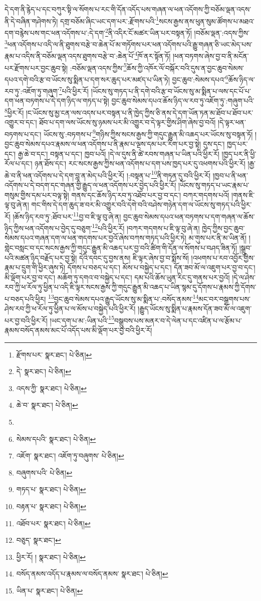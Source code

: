 དེ་དག་ནི་རྙེད་པ་དང་བཀུར་སྟི་ལ་སོགས་པ་རང་གི་དོན་འདོད་པས་གཞན་ལ་ཕན་འདོགས་ཀྱི་བཅོམ་ལྡན་འདས་ནི་དེ་བཞིན་གཤེགས་ཏེ། དགྲ་བཅོམ་ཞིང་ཡང་དག་པར་:རྫོགས་པའི་\footnote{རྫོགས་པར་  སྣར་ཐང་།  པེ་ཅིན། }སངས་རྒྱས་ནས་ཕུན་སུམ་ཚོགས་པ་མཐའ་དག་བརྙེས་པས་གང་ཕན་འདོགས་པ་:དེ་དག་\footnote{དེ་  སྣར་ཐང་།  པེ་ཅིན། }ནི་འདིར་ངོ་མཚར་ཡིན་པར་བསྟན་ཏོ། །བཅོམ་ལྡན་:འདས་ཀྱིས་\footnote{འདས་ཀྱི་  སྣར་ཐང་།  པེ་ཅིན། }ཕན་འདོགས་པ་འདི་ལ་ནི་ཐུགས་བརྩེ་བ་ཆེན་པོ་མ་གཏོགས་པར་ཕན་འདོགས་པའི་རྒྱུ་གཞན་ཅི་ཡང་མེད་པས་རྣམ་པ་འདིས་ནི་བཅོམ་ལྡན་འདས་ཐུགས་བརྩེ་བ་:ཆེན་པོ་\footnote{ཆེ་བ་  སྣར་ཐང་།  པེ་ཅིན། }ཁོ་ནར་སྟོན་ཏོ། །ཕན་བཏགས་ཞེས་བྱ་བ་ནི་མངོན་པར་རྫོགས་པར་བྱང་ཆུབ་སྟེ། :བཅོམ་ལྡན་འདས་ཀྱིས་\footnote{}ཆོས་ཀྱི་འཁོར་ལོ་བསྐོར་བའི་དུས་ན་བྱང་ཆུབ་སེམས་དཔའ་དགེ་བའི་རྩ་བ་ཡོངས་སུ་སྨིན་པ་དག་སར་ཆུད་པར་མཛད་པ་ཡིན་ཏེ། བྱང་ཆུབ་:སེམས་དཔའ་\footnote{སེམས་དཔའི་  སྣར་ཐང་།  པེ་ཅིན། }ཆོས་ཉིད་ལ་རབ་ཏུ་:འཇོག་ཏུ་གཞུག་\footnote{འཇོག་  སྣར་ཐང་། འཇོག་ཏུ་བཞུགས་  པེ་ཅིན། }པའི་ཕྱིར་རོ། །ཡོངས་སུ་གཏད་པ་ནི་དགེ་བའི་རྩ་བ་ཡོངས་སུ་མ་སྨིན་པ་ལས་དང་པོ་པ་དག་ཕན་བཏགས་པ་དེ་དག་ཉིད་ལ་གཏད་པ་སྟེ། བྱང་ཆུབ་སེམས་དཔའ་ཆོས་ཉིད་ལ་རབ་ཏུ་འཇོག་ཏུ་:གཞུག་པའི་\footnote{བཞུགས་པའི་  པེ་ཅིན། }ཕྱིར་རོ། །ང་ཡོངས་སུ་མྱ་ངན་ལས་འདས་པར་བསྟན་པ་ནི་ཁྱེད་ཀྱིས་ཅི་ནས་དེ་དག་ཡོན་ཏན་མ་ཐོབ་པ་ཐོབ་པར་འགྱུར་བ་དང་། ཐོབ་པ་དག་ལས་ཡོངས་སུ་ཉམས་པར་མི་འགྱུར་བ་དེ་ལྟར་གྱིས་ཤིག་ཞེས་བྱ་བའོ། །དེ་ལྟར་ཕན་བཏགས་པ་དང་། ཡོངས་སུ་:བཏགས་པ་\footnote{གཏད་པ་  སྣར་ཐང་།  པེ་ཅིན། }གཉིས་ཀྱིས་སངས་རྒྱས་ཀྱི་གདུང་རྒྱུན་མི་འཆད་པར་ཡོངས་སུ་བསྟན་ཏོ། །བྱང་ཆུབ་སེམས་དཔའ་རྣམས་ལ་ཕན་འདོགས་པ་ནི་རྣམ་པ་ལྔས་དམ་པར་རིག་པར་བྱ་སྟེ། དུས་དང་། ཁྱད་པར་དང་། རྒྱ་ཆེ་བ་དང་། བསྟན་པ་དང་། ཁྱབ་པའོ། །དེ་ལ་དུས་ནི་ཚེ་རབས་གཞན་པ་ཡིན་པའི་ཕྱིར་རོ། །ཁྱད་པར་ནི་ཕྱི་རོལ་པ་དང་། ཉན་ཐོས་དང་། རང་སངས་རྒྱས་ཀྱིས་ཕན་འདོགས་པ་དག་པས་ཁྱད་པར་དུ་འཕགས་པའི་ཕྱིར་རོ། །རྒྱ་ཆེ་བ་ནི་ཕན་འདོགས་པ་དེ་དག་བླ་ན་མེད་པའི་ཕྱིར་རོ། །:བསྟན་པ་\footnote{བརྟན་པ་  སྣར་ཐང་།  པེ་ཅིན། }ནི་གཏན་དུ་བའི་ཕྱིར་རོ། །ཁྱབ་པ་ནི་ཕན་འདོགས་པ་དེ་བདག་དང་གཞན་གྱི་རྒྱུད་ལ་ཕན་འདོགས་པར་བྱེད་པའི་ཕྱིར་རོ། །ཡོངས་སུ་གཏད་པ་ཡང་རྣམ་པ་གསུམ་གྱིས་དམ་པར་བལྟ་སྟེ། གནས་དང་ཆོས་ཉིད་རབ་ཏུ་འཐོབ་པར་བྱ་བ་དང་། བཀར་གདགས་པའོ། །གནས་ཇི་ལྟ་བུ་ཞེ་ན། གང་གིས་དེ་དག་ཆུད་ཟ་བར་མི་འགྱུར་བའི་དགེ་བའི་བཤེས་གཉེན་དག་ལ་ཡོངས་སུ་གཏད་པའི་ཕྱིར་རོ། །ཆོས་ཉིད་རབ་ཏུ་:ཐོབ་པར་\footnote{འཐོབ་པར་  སྣར་ཐང་།  པེ་ཅིན། }བྱ་བ་ཇི་ལྟ་བུ་ཞེ་ན། བྱང་ཆུབ་སེམས་དཔའ་ཕན་བཏགས་པ་དག་གཞན་ལ་ཆོས་ཉིད་ཀྱིས་ཕན་འདོགས་པ་བྱེད་དུ་བཅུག་\footnote{བཅུད་  སྣར་ཐང་། }པའི་ཕྱིར་རོ། །བཀར་གདགས་པ་ཇི་ལྟ་བུ་ཞེ་ན། ཁྱེད་ཀྱིས་བྱང་ཆུབ་སེམས་དཔའ་གཞན་དག་ལ་ཕན་གདགས་པར་བྱའོ་ཞེས་བཀས་གཏད་པའི་ཕྱིར་ཏེ། མ་གུས་པར་ནི་མ་ཡིན་ནོ། །གླེང་བསླང་བ་དང་སངས་རྒྱས་ཀྱི་གདུང་རྒྱུན་མི་འཆད་པར་བྱ་བའི་ཚིག་གི་དོན་ལ་སོགས་པ་བཤད་ཟིན་ཏོ། །སྒྲུབ་པའི་མཚན་ཉིད་བརྗོད་པར་བྱ་སྟེ། དེའི་དབང་དུ་བྱས་ནས། ཇི་ལྟར་ཞེས་བྱ་བ་སྨོས་སོ། །འཕགས་པ་རབ་འབྱོར་གྱིས་རྣམ་པ་དྲུག་གི་ཕྱིར་ཞུས་ཏེ། དོགས་པ་བཅད་པ་དང་། མོས་པ་བསྐྱེད་པ་དང་། དོན་ཟབ་མོ་ལ་འཇུག་པར་བྱ་བ་དང་། མི་ལྡོག་པར་བྱ་བ་དང་། མཆོག་ཏུ་དགའ་བ་བསྐྱེད་པ་དང་། དམ་པའི་ཆོས་ཡུན་རིང་དུ་གནས་པར་བྱའོ། །དེ་ལ་ཤེས་རབ་ཀྱི་ཕ་རོལ་ཏུ་ཕྱིན་པ་འདི་ཇི་ལྟར་སངས་རྒྱས་ཀྱི་གདུང་རྒྱུན་མི་འཆད་པ་ཡིན་སྙམ་དུ་དོགས་པ་རྣམས་ཀྱི་དོགས་པ་བཅད་པའི་ཕྱིར། \footnote{ཕྱིར་རོ། །   སྣར་ཐང་།  པེ་ཅིན། }བྱང་ཆུབ་སེམས་དཔའ་རྒྱུད་ཡོངས་སུ་མ་སྨིན་པ་:བསོད་ནམས་\footnote{བསོད་ནམས་འདོད་པ་རྣམས་ལ་བསོད་ནམས་  སྣར་ཐང་།  པེ་ཅིན། }མང་བར་བསྒྲགས་པས་ཤེས་རབ་ཀྱི་ཕ་རོལ་ཏུ་ཕྱིན་པ་ལ་མོས་པ་བསྐྱེད་པའི་ཕྱིར་རོ། །རྒྱུད་ཡོངས་སུ་སྨིན་པ་རྣམས་དོན་ཟབ་མོ་ལ་འཇུག་པར་བྱ་བའི་ཕྱིར་རོ། །ཡང་དག་པ་མ་:ཡིན་པའི་\footnote{ཡིན་པ་  སྣར་ཐང་།  པེ་ཅིན། }བསྒྲུབས་པས་མནར་བ་དེ་ལེན་པ་དང་འཛིན་པ་ལ་རྩོམ་པ་རྣམས་བསོད་ནམས་མང་པོ་འདོད་པས་མི་ལྡོག་པར་བྱ་བའི་ཕྱིར་རོ། 